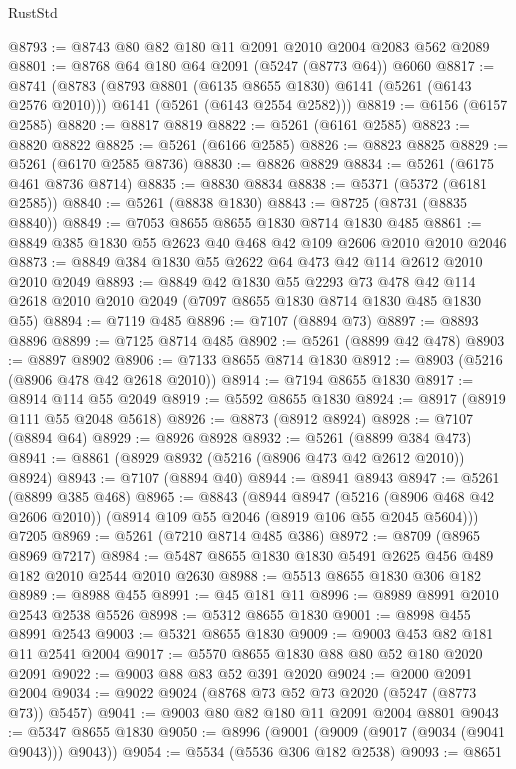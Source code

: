 \begin{lexlean}{RustStd}
\begin{coremodule}
@8793 := @8743 @80 @82 @180 @11 @2091 @2010 @2004 @2083 @562 @2089
@8801 := @8768 @64 @180 @64 @2091 (@5247 (@8773 @64)) @6060
@8817 := @8741
    (@8783
      (@8793 @8801 (@6135 @8655 @1830) @6141 (@5261 (@6143 @2576 @2010)))
      @6141
      (@5261 (@6143 @2554 @2582)))
@8819 := @6156 (@6157 @2585)
@8820 := @8817 @8819
@8822 := @5261 (@6161 @2585)
@8823 := @8820 @8822
@8825 := @5261 (@6166 @2585)
@8826 := @8823 @8825
@8829 := @5261 (@6170 @2585 @8736)
@8830 := @8826 @8829
@8834 := @5261 (@6175 @461 @8736 @8714)
@8835 := @8830 @8834
@8838 := @5371 (@5372 (@6181 @2585))
@8840 := @5261 (@8838 @1830)
@8843 := @8725 (@8731 (@8835 @8840))
@8849 := @7053 @8655 @8655 @1830 @8714 @1830 @485
@8861 := @8849 @385 @1830 @55 @2623 @40 @468 @42 @109 @2606 @2010 @2010 @2046
@8873 := @8849 @384 @1830 @55 @2622 @64 @473 @42 @114 @2612 @2010 @2010 @2049
@8893 := @8849
    @42
    @1830
    @55
    @2293
    @73
    @478
    @42
    @114
    @2618
    @2010
    @2010
    @2049
    (@7097 @8655 @1830 @8714 @1830 @485 @1830 @55)
@8894 := @7119 @485
@8896 := @7107 (@8894 @73)
@8897 := @8893 @8896
@8899 := @7125 @8714 @485
@8902 := @5261 (@8899 @42 @478)
@8903 := @8897 @8902
@8906 := @7133 @8655 @8714 @1830
@8912 := @8903 (@5216 (@8906 @478 @42 @2618 @2010))
@8914 := @7194 @8655 @1830
@8917 := @8914 @114 @55 @2049
@8919 := @5592 @8655 @1830
@8924 := @8917 (@8919 @111 @55 @2048 @5618)
@8926 := @8873 (@8912 @8924)
@8928 := @7107 (@8894 @64)
@8929 := @8926 @8928
@8932 := @5261 (@8899 @384 @473)
@8941 := @8861 (@8929 @8932 (@5216 (@8906 @473 @42 @2612 @2010)) @8924)
@8943 := @7107 (@8894 @40)
@8944 := @8941 @8943
@8947 := @5261 (@8899 @385 @468)
@8965 := @8843
    (@8944
      @8947
      (@5216 (@8906 @468 @42 @2606 @2010))
      (@8914 @109 @55 @2046 (@8919 @106 @55 @2045 @5604)))
    @7205
@8969 := @5261 (@7210 @8714 @485 @386)
@8972 := @8709 (@8965 @8969 @7217)
@8984 := @5487 @8655 @1830 @1830 @5491 @2625 @456 @489 @182 @2010 @2544 @2010 @2630
@8988 := @5513 @8655 @1830 @306 @182
@8989 := @8988 @455
@8991 := @45 @181 @11
@8996 := @8989 @8991 @2010 @2543 @2538 @5526
@8998 := @5312 @8655 @1830
@9001 := @8998 @455 @8991 @2543
@9003 := @5321 @8655 @1830
@9009 := @9003 @453 @82 @181 @11 @2541 @2004
@9017 := @5570 @8655 @1830 @88 @80 @52 @180 @2020 @2091
@9022 := @9003 @88 @83 @52 @391 @2020
@9024 := @2000 @2091 @2004
@9034 := @9022 @9024 (@8768 @73 @52 @73 @2020 (@5247 (@8773 @73)) @5457)
@9041 := @9003 @80 @82 @180 @11 @2091 @2004 @8801
@9043 := @5347 @8655 @1830
@9050 := @8996 (@9001 (@9009 (@9017 (@9034 (@9041 @9043))) @9043))
@9054 := @5534 (@5536 @306 @182 @2538)
@9093 := @8651

\end{coremodule}
\end{lexlean}
